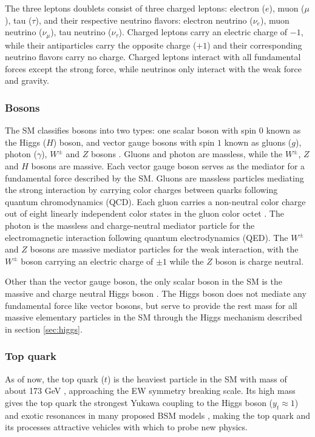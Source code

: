 \documentclass[../thesis.tex]{subfiles}
\begin{document}
The three leptons doublets consist of three charged leptons: electron ($e$), muon ($\mu$), tau ($\tau$), and their respective neutrino flavors: electron neutrino ($\nu_e$), muon neutrino ($\nu_\mu$), tau neutrino ($\nu_\tau$). Charged leptons carry an electric charge of $-1$, while their antiparticles carry the opposite charge ($+1$) and their corresponding neutrino flavors carry no charge. Charged leptons interact with all fundamental forces except the strong force, while neutrinos only interact with the weak force and gravity.

\subsubsection*{Bosons}
The \acs{SM} classifies bosons into two types: one scalar boson with spin $0$ known as the Higgs ($H$) boson, and vector gauge bosons with spin $1$ known as gluons ($g$), photon ($\gamma$), $W^\pm$ and $Z$ bosons \citep{PDG}. Gluons and photon are massless, while the $W^\pm$, $Z$ and $H$ bosons are massive. Each vector gauge boson serves as the mediator for a fundamental force described by the \acs{SM}. Gluons are massless particles mediating the strong interaction by carrying color charges between quarks following quantum chromodynamics (\acs{QCD}). Each gluon carries a non-neutral color charge out of eight linearly independent color states in the gluon color octet \citep{theory:gellmann}. The photon is the massless and charge-neutral mediator particle for the electromagnetic interaction following quantum electrodynamics (\acs{QED}). The $W^\pm$ and $Z$ bosons are massive mediator particles for the weak interaction, with the $W^\pm$ boson carrying an electric charge of $\pm 1$ while the $Z$ boson is charge neutral.

Other than the vector gauge boson, the only scalar boson in the \acs{SM} is the massive and charge neutral Higgs boson \citep{PDG}. The Higgs boson does not mediate any fundamental force like vector bosons, but serve to provide the rest mass for all massive elementary particles in the \acs{SM} through the Higgs mechanism described in section \ref{sec:higgs}.

\subsubsection*{Top quark}
\label{sec:top}

As of now, the top quark ($t$) is the heaviest particle in the \acs{SM} with mass of about 173 GeV \citep{TOPQ-2019-13}, approaching the \acs{EW} symmetry breaking scale. Its high mass gives the top quark the strongest Yukawa coupling to the Higgs boson ($y_t \approx 1$) \citep{theory:top_coupling} and exotic resonances in many proposed \acs{BSM} models \citep{theory:top_exotics,theory:top_exotics2,theory:top_exotics3,theory:top_exotics4}, making the top quark and its processes attractive vehicles with which to probe new physics.
\end{document}
